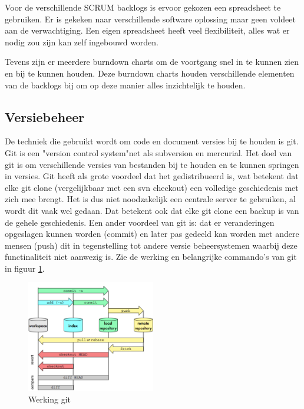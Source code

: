 \documentclass[]{article}
\begin{document}
Voor de verschillende SCRUM backlogs is ervoor gekozen een spreadsheet te
gebruiken. Er is gekeken naar verschillende software oplossing maar geen
voldeet aan de verwachtiging. Een eigen spreadsheet heeft veel
flexibiliteit, alles wat er nodig zou zijn kan zelf ingebouwd worden.

Tevens zijn er meerdere burndown charts om de voortgang snel in te kunnen
zien en bij te kunnen houden. Deze burndown charts houden verschillende
elementen van de backlogs bij om op deze manier alles inzichtelijk te
houden.

\newpage
\subsection{Versiebeheer}

De techniek die gebruikt wordt om code en document versies bij te houden is
git. Git is een "version control system"\space net als subversion en
mercurial. Het doel van git is om verschillende versies van bestanden bij
te houden en te kunnen springen in versies. Git heeft als grote voordeel
dat het gedistribueerd is, wat betekent dat elke git clone (vergelijkbaar
met een svn checkout) een volledige geschiedenis met zich mee brengt. Het is
dus niet noodzakelijk een centrale server te gebruiken, al wordt dit vaak
wel gedaan. Dat betekent ook dat elke git clone een backup is van de gehele
geschiedenis. Een ander voordeel van git is: dat er veranderingen opgeslagen
kunnen worden (commit) en later pas gedeeld kan worden met andere mensen (push) dit in
tegenstelling tot andere versie beheersystemen waarbij deze functinaliteit niet
aanwezig is. Zie de werking en belangrijke commando's van git in figuur \ref{git}.

\begin{figure}[htpb]
  \begin{center}
    \includegraphics[width=0.50\textwidth]{git_diagram.pdf}
  \end{center}
  \caption{Werking git}
  \label{git}
\end{figure}
\end{document}
